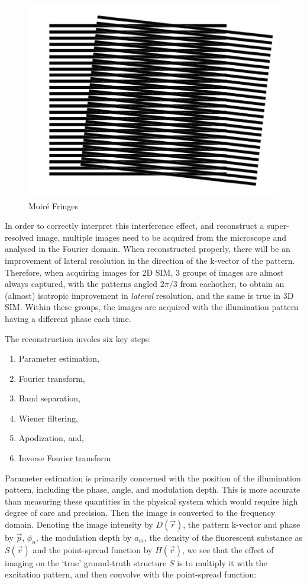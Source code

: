 \documentclass[12pt]{article}
\begin{document}
\begin{figure}[hbt]
    \includegraphics[scale=0.5]{figures/moire.png}
    \caption{Moir\'{e} Fringes}
    \label{fig:moire}
\end{figure}

In order to correctly interpret this interference effect, and reconstruct a super-resolved image,
multiple images need to be acquired from the microscope and analysed in the Fourier domain.
When reconstructed properly, there will be an improvement of lateral resolution in the direction of the k-vector of the pattern.
Therefore, when acquiring images for 2D SIM, 3 groups of images are almost always captured,
with the patterns angled $2\pi/3$ from eachother, to obtain an (almost) isotropic improvement in \textit{lateral} resolution,
and the same is true in 3D SIM.
Within these groups, the images are acquired with the illumination pattern having a different phase each time.

The reconstruction involes six key steps:
\begin{enumerate}
    \item Parameter estimation,
    \item Fourier transform,
    \item Band separation,
    \item Wiener filtering,
    \item Apodization, and,
    \item Inverse Fourier transform
\end{enumerate}

Parameter estimation is primarily concerned with the position of the illumination pattern,
including the phase, angle, and modulation depth.
This is more accurate than measuring these quantities in the physical system which would require high degree of care and precision.
Then the image is converted to the frequency domain.
Denoting the image intensity by $D(\vec{r})$, the pattern k-vector and phase by $\vec{p}$, $\phi_n$,
the modulation depth by $a_m$, the density of the fluorescent substance as $S(\vec{r})$ and the point-spread function by $H(\vec{r})$,
we see that the effect of imaging on the `true' ground-truth structure $S$ is to multiply it with the excitation pattern,
and then convolve with the point-spread function:
\end{document}
